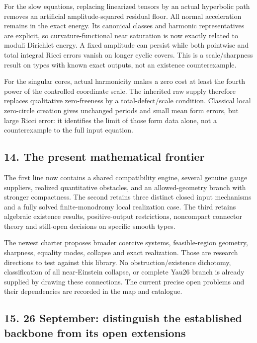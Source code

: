 \documentclass[
  10pt,
]{article}
\begin{document}
For the slow equations, replacing linearized tensors by an actual
hyperbolic path removes an artificial amplitude-squared residual floor.
All normal acceleration remains in the exact energy. Its canonical
classes and harmonic representatives are explicit, so
curvature-functional near saturation is now exactly related to moduli
Dirichlet energy. A fixed amplitude can persist while both pointwise and
total integral Ricci errors vanish on longer cyclic covers. This is a
scale/sharpness result on types with known exact outputs, not an
existence counterexample.

For the singular cores, actual harmonicity makes a zero cost at least
the fourth power of the controlled coordinate scale. The inherited raw
supply therefore replaces qualitative zero-freeness by a
total-defect/scale condition. Classical local zero-circle creation gives
unchanged periods and small mean form errors, but large Ricci error: it
identifies the limit of those form data alone, not a counterexample to
the full input equation.

\hypertarget{the-present-mathematical-frontier}{%
\subsection{14. The present mathematical
frontier}\label{the-present-mathematical-frontier}}

The first line now contains a shared compatibility engine, several
genuine gauge suppliers, realized quantitative obstacles, and an
allowed-geometry branch with stronger compactness. The second retains
three distinct closed input mechanisms and a fully solved
finite-monodromy local realization case. The third retains algebraic
existence results, positive-output restrictions, noncompact connector
theory and still-open decisions on specific smooth types.

The newest charter proposes broader coercive systems, feasible-region
geometry, sharpness, equality modes, collapse and exact realization.
Those are research directions to test against this library. No
obstruction/existence dichotomy, classification of all near-Einstein
collapse, or complete Yau26 branch is already supplied by drawing these
connections. The current precise open problems and their dependencies
are recorded in the map and catalogue.

\hypertarget{september-distinguish-the-established-backbone-from-its-open-extensions}{%
\subsection{15. 26 September: distinguish the established backbone from
its open
extensions}\label{september-distinguish-the-established-backbone-from-its-open-extensions}}
\end{document}
